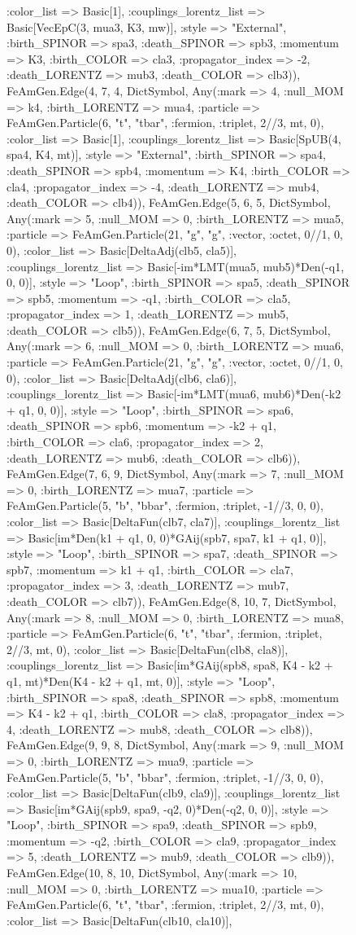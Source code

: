 \documentclass{revtex4}
\begin{document}
\begin{figure}[!htb]
\begin{center}
{:color_list => Basic[1], :couplings_lorentz_list => Basic[VecEpC(3, mua3, K3, mw)], :style => "External", :birth_SPINOR => spa3, :death_SPINOR => spb3, :momentum => K3, :birth_COLOR => cla3, :propagator_index => -2, :death_LORENTZ => mub3, :death_COLOR => clb3)), FeAmGen.Edge(4, 7, 4, Dict{Symbol, Any}(:mark => 4, :null_MOM => k4, :birth_LORENTZ => mua4, :particle => FeAmGen.Particle(6, "t", "tbar", :fermion, :triplet, 2//3, mt, 0), :color_list => Basic[1], :couplings_lorentz_list => Basic[SpUB(4, spa4, K4, mt)], :style => "External", :birth_SPINOR => spa4, :death_SPINOR => spb4, :momentum => K4, :birth_COLOR => cla4, :propagator_index => -4, :death_LORENTZ => mub4, :death_COLOR => clb4)), FeAmGen.Edge(5, 6, 5, Dict{Symbol, Any}(:mark => 5, :null_MOM => 0, :birth_LORENTZ => mua5, :particle => FeAmGen.Particle(21, "g", "g", :vector, :octet, 0//1, 0, 0), :color_list => Basic[DeltaAdj(clb5, cla5)], :couplings_lorentz_list => Basic[-im*LMT(mua5, mub5)*Den(-q1, 0, 0)], :style => "Loop", :birth_SPINOR => spa5, :death_SPINOR => spb5, :momentum => -q1, :birth_COLOR => cla5, :propagator_index => 1, :death_LORENTZ => mub5, :death_COLOR => clb5)), FeAmGen.Edge(6, 7, 5, Dict{Symbol, Any}(:mark => 6, :null_MOM => 0, :birth_LORENTZ => mua6, :particle => FeAmGen.Particle(21, "g", "g", :vector, :octet, 0//1, 0, 0), :color_list => Basic[DeltaAdj(clb6, cla6)], :couplings_lorentz_list => Basic[-im*LMT(mua6, mub6)*Den(-k2 + q1, 0, 0)], :style => "Loop", :birth_SPINOR => spa6, :death_SPINOR => spb6, :momentum => -k2 + q1, :birth_COLOR => cla6, :propagator_index => 2, :death_LORENTZ => mub6, :death_COLOR => clb6)), FeAmGen.Edge(7, 6, 9, Dict{Symbol, Any}(:mark => 7, :null_MOM => 0, :birth_LORENTZ => mua7, :particle => FeAmGen.Particle(5, "b", "bbar", :fermion, :triplet, -1//3, 0, 0), :color_list => Basic[DeltaFun(clb7, cla7)], :couplings_lorentz_list => Basic[im*Den(k1 + q1, 0, 0)*GAij(spb7, spa7, k1 + q1, 0)], :style => "Loop", :birth_SPINOR => spa7, :death_SPINOR => spb7, :momentum => k1 + q1, :birth_COLOR => cla7, :propagator_index => 3, :death_LORENTZ => mub7, :death_COLOR => clb7)), FeAmGen.Edge(8, 10, 7, Dict{Symbol, Any}(:mark => 8, :null_MOM => 0, :birth_LORENTZ => mua8, :particle => FeAmGen.Particle(6, "t", "tbar", :fermion, :triplet, 2//3, mt, 0), :color_list => Basic[DeltaFun(clb8, cla8)], :couplings_lorentz_list => Basic[im*GAij(spb8, spa8, K4 - k2 + q1, mt)*Den(K4 - k2 + q1, mt, 0)], :style => "Loop", :birth_SPINOR => spa8, :death_SPINOR => spb8, :momentum => K4 - k2 + q1, :birth_COLOR => cla8, :propagator_index => 4, :death_LORENTZ => mub8, :death_COLOR => clb8)), FeAmGen.Edge(9, 9, 8, Dict{Symbol, Any}(:mark => 9, :null_MOM => 0, :birth_LORENTZ => mua9, :particle => FeAmGen.Particle(5, "b", "bbar", :fermion, :triplet, -1//3, 0, 0), :color_list => Basic[DeltaFun(clb9, cla9)], :couplings_lorentz_list => Basic[im*GAij(spb9, spa9, -q2, 0)*Den(-q2, 0, 0)], :style => "Loop", :birth_SPINOR => spa9, :death_SPINOR => spb9, :momentum => -q2, :birth_COLOR => cla9, :propagator_index => 5, :death_LORENTZ => mub9, :death_COLOR => clb9)), FeAmGen.Edge(10, 8, 10, Dict{Symbol, Any}(:mark => 10, :null_MOM => 0, :birth_LORENTZ => mua10, :particle => FeAmGen.Particle(6, "t", "tbar", :fermion, :triplet, 2//3, mt, 0), :color_list => Basic[DeltaFun(clb10, cla10)], }
\end{center}
\end{figure}
\end{document}
